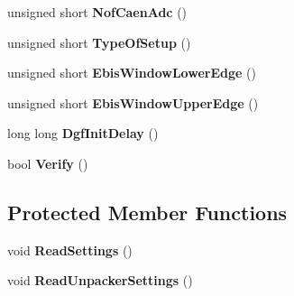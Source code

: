 \begin{DoxyCompactItemize}
\item 
\hypertarget{class_global_settings_a0451be00dc54ba72b862ba682399e5e2}{unsigned short {\bfseries Nof\-Caen\-Adc} ()}\label{class_global_settings_a0451be00dc54ba72b862ba682399e5e2}

\item 
\hypertarget{class_global_settings_a5fd349a287cbe0159fb24d4ae2264fbb}{unsigned short {\bfseries Type\-Of\-Setup} ()}\label{class_global_settings_a5fd349a287cbe0159fb24d4ae2264fbb}

\item 
\hypertarget{class_global_settings_ae3067cec604f4bf7692c2a635411ffa3}{unsigned short {\bfseries Ebis\-Window\-Lower\-Edge} ()}\label{class_global_settings_ae3067cec604f4bf7692c2a635411ffa3}

\item 
\hypertarget{class_global_settings_ad13bfa3edd5436f4096e52d742348da7}{unsigned short {\bfseries Ebis\-Window\-Upper\-Edge} ()}\label{class_global_settings_ad13bfa3edd5436f4096e52d742348da7}

\item 
\hypertarget{class_global_settings_a2b7b49aa025fef97a5c5bf50f7b181c7}{long long {\bfseries Dgf\-Init\-Delay} ()}\label{class_global_settings_a2b7b49aa025fef97a5c5bf50f7b181c7}

\item 
\hypertarget{class_global_settings_a7057529627ce885278a417a6b31634fd}{bool {\bfseries Verify} ()}\label{class_global_settings_a7057529627ce885278a417a6b31634fd}

\end{DoxyCompactItemize}
\subsection*{Protected Member Functions}
\begin{DoxyCompactItemize}
\item 
\hypertarget{class_global_settings_a4ff35326d7293d230edd31fbf67bb10b}{void {\bfseries Read\-Settings} ()}\label{class_global_settings_a4ff35326d7293d230edd31fbf67bb10b}

\item 
\hypertarget{class_global_settings_ac91eec1a20a1366ec4859dd06249cf6d}{void {\bfseries Read\-Unpacker\-Settings} ()}\label{class_global_settings_ac91eec1a20a1366ec4859dd06249cf6d}

\end{DoxyCompactItemize}
